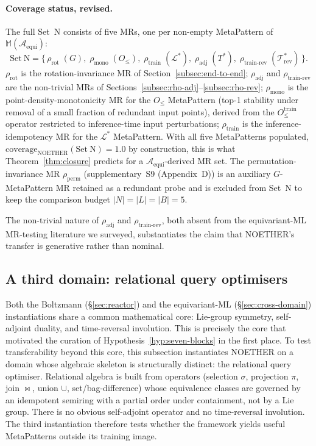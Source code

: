 \documentclass[acmsmall,screen,review]{acmart}
\begin{document}
\paragraph{Coverage status, revised.} The full Set~N consists of five MRs, one per non-empty MetaPattern of $\mathbb{M}(\mathcal{A}_{\mathrm{equi}})$:
$$
\mathrm{Set\ N} = \bigl\{\,\rho_{\mathrm{rot}}\;(G),\; \rho_{\mathrm{mono}}\;(O_{\le}),\; \rho_{\mathrm{train}}\;(\mathcal{L}^*),\; \rho_{\mathrm{adj}}\;(T^*),\; \rho_{\mathrm{train\text{-}rev}}\;(\mathcal{T}^{*}_{\mathrm{rev}})\,\bigr\}.
$$
$\rho_{\mathrm{rot}}$ is the rotation-invariance MR of Section~\ref{subsec:end-to-end}; $\rho_{\mathrm{adj}}$ and $\rho_{\mathrm{train\text{-}rev}}$ are the non-trivial MRs of Sections~\ref{subsec:rho-adj}--\ref{subsec:rho-rev}; $\rho_{\mathrm{mono}}$ is the point-density-monotonicity MR for the $O_{\le}$ MetaPattern (top-1 stability under removal of a small fraction of redundant input points), derived from the $O_{\le}^{\mathrm{train}}$ operator restricted to inference-time input perturbations; $\rho_{\mathrm{train}}$ is the inference-idempotency MR for the $\mathcal{L}^*$ MetaPattern. With all five MetaPatterns populated, $\mathrm{coverage}_{\mathrm{NOETHER}}(\mathrm{Set\ N}) = 1.0$ by construction, this is what Theorem~\ref{thm:closure} predicts for a $\mathcal{A}_{\mathrm{equi}}$-derived MR set. The permutation-invariance MR $\rho_{\mathrm{perm}}$ (supplementary~S9 (Appendix~D)) is an auxiliary $G$-MetaPattern MR retained as a redundant probe and is excluded from Set~N to keep the comparison budget $|N| = |L| = |B| = 5$.

The non-trivial nature of $\rho_{\mathrm{adj}}$ and $\rho_{\mathrm{train\text{-}rev}}$, both absent from the equivariant-ML MR-testing literature we surveyed, substantiates the claim that NOETHER's transfer is generative rather than nominal.

\subsection{A third domain: relational query optimisers}
\label{subsec:third-domain}

Both the Boltzmann (\S\ref{sec:reactor}) and the equivariant-ML (\S\ref{sec:cross-domain}) instantiations share a common mathematical core: Lie-group symmetry, self-adjoint duality, and time-reversal involution. This is precisely the core that motivated the curation of Hypothesis~\ref{hyp:seven-blocks} in the first place. To test transferability beyond this core, this subsection instantiates NOETHER on a domain whose algebraic skeleton is structurally distinct: the relational query optimiser. Relational algebra is built from operators (selection $\sigma$, projection $\pi$, join $\bowtie$, union $\cup$, set/bag-difference) whose equivalence classes are governed by an idempotent semiring with a partial order under containment, not by a Lie group. There is no obvious self-adjoint operator and no time-reversal involution. The third instantiation therefore tests whether the framework yields useful MetaPatterns outside its training image.
\end{document}
